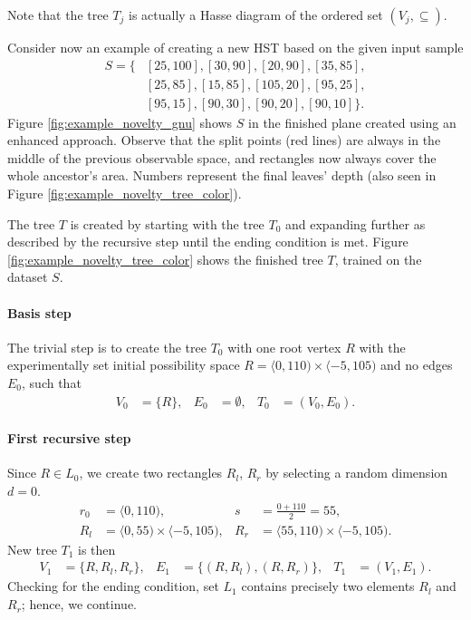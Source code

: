 Note that the tree \(T_{j}\) is actually a Hasse diagram of the ordered set
\((V_j,\subseteq)\).


\begin{example}
\label{example:novelty_tree_create}
Consider now an example of creating a new HST based on the given input sample
\begin{align*}
    S = \{&[25,100],[30,90],[20,90],[35,85],\\
    &[25,85],[15,85],[105,20],[95,25], \\
    &[95,15],[90,30],[90,20],[90,10]\}.
\end{align*}
Figure \ref{fig:example_novelty_gnu} shows $S$ in the finished plane created using an enhanced approach. Observe that the split points (red lines) are always in the middle of the previous observable space, and rectangles now always cover the whole ancestor's area. Numbers represent the final leaves' depth (also seen in Figure \ref{fig:example_novelty_tree_color}).

\begin{figure*}[!t]
\centering

\caption{Enhanced approach. Rectangles created by recursive splitting.}
\label{fig:example_novelty_gnu}
\end{figure*}

The tree $T$ is created by starting with the tree $T_0$ and expanding further as described by the recursive step until the ending condition is met.
Figure \ref{fig:example_novelty_tree_color} shows the finished tree $T$, trained on the dataset $S$.

\paragraph{Basis step} 
The trivial step is to create the tree $T_0$ with one root vertex $R$ with the experimentally set initial possibility space  $R= \langle 0,110) \times \langle -5,105)$ and no edges $E_0$, such that
    \begin{align*}
        V_0 &= \{R\},&
        E_0 &= \emptyset,&
        T_0 &= (V_0, E_0).
    \end{align*}

\paragraph{First recursive step}
     Since $R \in L_0$, we create two rectangles $R_l$, $R_r$ by selecting a random dimension $d=0$.
    \begin{align*}
        r_0 &= \langle 0, 110), &
        s &= \frac{0 + 110}{2} = 55, \\
        R_l &= \langle 0, 55) \times \langle -5,105), &
        R_r &= \langle 55, 110) \times \langle -5,105).
    \end{align*}
     New tree $T_1$ is then
    \begin{align*}
    V_1 &= \{R, R_l, R_r\}, &
    E_1 &= \{(R, R_l), (R, R_r)\}, &
    T_1 &= (V_1, E_1).
    \end{align*}
    Checking for the ending condition, set $L_1$ contains precisely two elements $R_l$ and $R_r$; hence, we continue.
     

\end{example}
